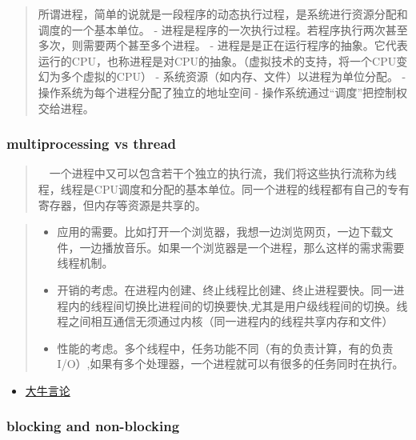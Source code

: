 \documentclass[11pt]{article}
\providecommand{\tightlist}{%
      \setlength{\itemsep}{0pt}\setlength{\parskip}{0pt}}
\begin{document}
\begin{quote}
所谓进程，简单的说就是一段程序的动态执行过程，是系统进行资源分配和调度的一个基本单位。
-
进程是程序的一次执行过程。若程序执行两次甚至多次，则需要两个甚至多个进程。
-
进程是是正在运行程序的抽象。它代表运行的CPU，也称进程是对CPU的抽象。（虚拟技术的支持，将一个CPU变幻为多个虚拟的CPU）
- 系统资源（如内存、文件）以进程为单位分配。 -
操作系统为每个进程分配了独立的地址空间 -
操作系统通过``调度''把控制权交给进程。
\end{quote}

    \hypertarget{multiprocessing-vs-thread}{%
\subsubsection{multiprocessing vs
thread}\label{multiprocessing-vs-thread}}

\begin{quote}
　一个进程中又可以包含若干个独立的执行流，我们将这些执行流称为线程，线程是CPU调度和分配的基本单位。同一个进程的线程都有自己的专有寄存器，但内存等资源是共享的。
\end{quote}

\begin{quote}
\begin{itemize}
\tightlist
\item
  应用的需要。比如打开一个浏览器，我想一边浏览网页，一边下载文件，一边播放音乐。如果一个浏览器是一个进程，那么这样的需求需要线程机制。
\item
  开销的考虑。在进程内创建、终止线程比创建、终止进程要快。同一进程内的线程间切换比进程间的切换要快,尤其是用户级线程间的切换。线程之间相互通信无须通过内核（同一进程内的线程共享内存和文件）
\item
  性能的考虑。多个线程中，任务功能不同（有的负责计算，有的负责I/O）,如果有多个处理器，一个进程就可以有很多的任务同时在执行。
\end{itemize}
\end{quote}

    \begin{itemize}
\tightlist
\item
  \href{http://www.ruanyifeng.com/blog/2013/04/processes_and_threads.html}{大牛言论}
\end{itemize}

    \hypertarget{blocking-and-non-blocking}{%
\subsubsection{blocking and
non-blocking}\label{blocking-and-non-blocking}}
\end{document}
